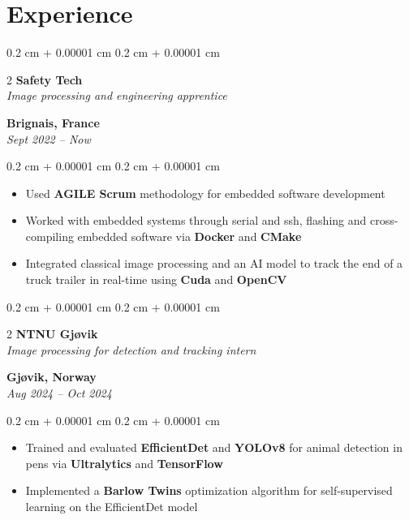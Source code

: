 \documentclass[10pt, letterpaper]{article}
\newenvironment{highlights}{
    \begin{itemize}[
        topsep=0.10 cm,
        parsep=0.10 cm,
        partopsep=0pt,
        itemsep=0pt,
        leftmargin=0.4 cm + 10pt
    ]
}{
    \end{itemize}
} %
\newenvironment{onecolentry}{
    \begin{adjustwidth}{
        0.2 cm + 0.00001 cm
    }{
        0.2 cm + 0.00001 cm
    }
}{
    \end{adjustwidth}
} %
\newenvironment{twocolentry}[2][]{
    \onecolentry
    \def\secondColumn{#2}
    \setcolumnwidth{\fill, 6 cm}
    \begin{paracol}{2}
}{
    \switchcolumn \raggedleft \secondColumn
    \end{paracol}
    \endonecolentry
} %
\begin{document}
    \section{Experience}
        \begin{twocolentry}{
			\textbf{Brignais, France} \\
			\textit{Sept 2022 – Now}
            }{
            \textbf{Safety Tech} \\
            \textit{Image processing and engineering apprentice}
            }
        \end{twocolentry}

        \begin{onecolentry}
            \begin{highlights}
                \item Used \textbf{AGILE Scrum} methodology for embedded software development
				\item Worked with embedded systems through serial and ssh, flashing and cross-compiling embedded software via \textbf{Docker} and \textbf{CMake}
				\item Integrated classical image processing and an AI model to track the end of a truck trailer in real-time using \textbf{Cuda} and \textbf{OpenCV}
            \end{highlights}
        \end{onecolentry}

        \begin{twocolentry}{
			\textbf{Gjøvik, Norway} \\
			\textit{Aug 2024 – Oct 2024}
            }{
			\textbf{NTNU Gjøvik} \\
			\textit{Image processing for detection and tracking intern}
            }
        \end{twocolentry}

        \begin{onecolentry}
            \begin{highlights}
                \item Trained and evaluated \textbf{EfficientDet} and \textbf{YOLOv8} for animal detection in pens via \textbf{Ultralytics} and \textbf{TensorFlow}
                \item Implemented a \textbf{Barlow Twins} optimization algorithm for self-supervised learning on the EfficientDet model
            \end{highlights}
        \end{onecolentry}

	
\end{document}
